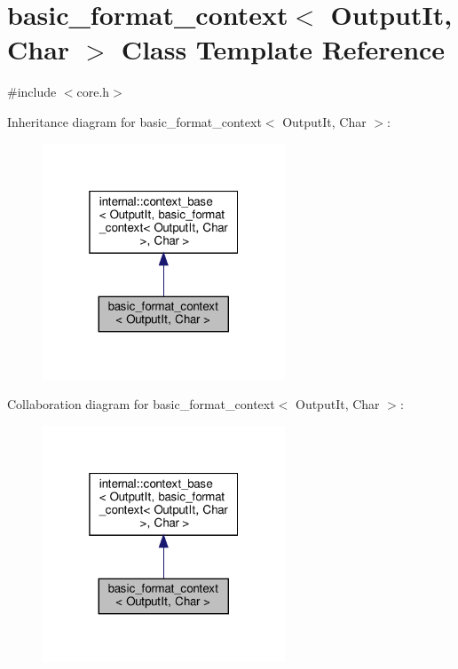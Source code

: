 \hypertarget{classbasic__format__context}{}\section{basic\+\_\+format\+\_\+context$<$ Output\+It, Char $>$ Class Template Reference}
\label{classbasic__format__context}


{\ttfamily \#include $<$core.\+h$>$}



Inheritance diagram for basic\+\_\+format\+\_\+context$<$ Output\+It, Char $>$\+:
\nopagebreak
\begin{figure}[H]
\begin{center}
\leavevmode
\includegraphics[width=205pt]{classbasic__format__context__inherit__graph}
\end{center}
\end{figure}


Collaboration diagram for basic\+\_\+format\+\_\+context$<$ Output\+It, Char $>$\+:
\nopagebreak
\begin{figure}[H]
\begin{center}
\leavevmode
\includegraphics[width=205pt]{classbasic__format__context__coll__graph}
\end{center}
\end{figure}
